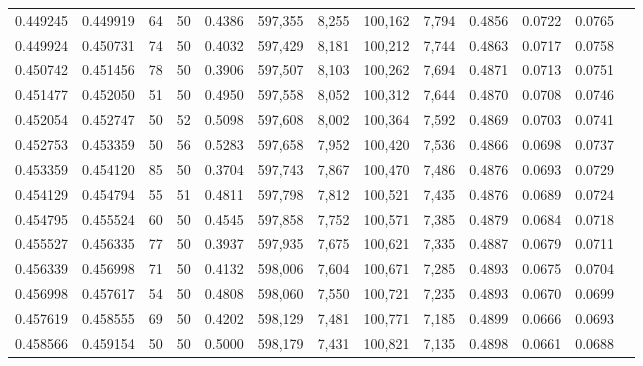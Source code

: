 \begin{tabular}{rrrrrrrrrrrrr}
0.449245 & 0.449919 &    64 &  50 &                                     0.4386 & 597,355 &   8,255 & 100,162 &   7,794 & 0.4856 & 0.0722 & 0.0765 \\
0.449924 & 0.450731 &    74 &  50 &                                     0.4032 & 597,429 &   8,181 & 100,212 &   7,744 & 0.4863 & 0.0717 & 0.0758 \\
0.450742 & 0.451456 &    78 &  50 &                                     0.3906 & 597,507 &   8,103 & 100,262 &   7,694 & 0.4871 & 0.0713 & 0.0751 \\
0.451477 & 0.452050 &    51 &  50 &                                     0.4950 & 597,558 &   8,052 & 100,312 &   7,644 & 0.4870 & 0.0708 & 0.0746 \\
0.452054 & 0.452747 &    50 &  52 &                                     0.5098 & 597,608 &   8,002 & 100,364 &   7,592 & 0.4869 & 0.0703 & 0.0741 \\
0.452753 & 0.453359 &    50 &  56 &                                     0.5283 & 597,658 &   7,952 & 100,420 &   7,536 & 0.4866 & 0.0698 & 0.0737 \\
0.453359 & 0.454120 &    85 &  50 &                                     0.3704 & 597,743 &   7,867 & 100,470 &   7,486 & 0.4876 & 0.0693 & 0.0729 \\
0.454129 & 0.454794 &    55 &  51 &                                     0.4811 & 597,798 &   7,812 & 100,521 &   7,435 & 0.4876 & 0.0689 & 0.0724 \\
0.454795 & 0.455524 &    60 &  50 &                                     0.4545 & 597,858 &   7,752 & 100,571 &   7,385 & 0.4879 & 0.0684 & 0.0718 \\
0.455527 & 0.456335 &    77 &  50 &                                     0.3937 & 597,935 &   7,675 & 100,621 &   7,335 & 0.4887 & 0.0679 & 0.0711 \\
0.456339 & 0.456998 &    71 &  50 &                                     0.4132 & 598,006 &   7,604 & 100,671 &   7,285 & 0.4893 & 0.0675 & 0.0704 \\
0.456998 & 0.457617 &    54 &  50 &                                     0.4808 & 598,060 &   7,550 & 100,721 &   7,235 & 0.4893 & 0.0670 & 0.0699 \\
0.457619 & 0.458555 &    69 &  50 &                                     0.4202 & 598,129 &   7,481 & 100,771 &   7,185 & 0.4899 & 0.0666 & 0.0693 \\
0.458566 & 0.459154 &    50 &  50 &                                     0.5000 & 598,179 &   7,431 & 100,821 &   7,135 & 0.4898 & 0.0661 & 0.0688 \\

\end{tabular}
